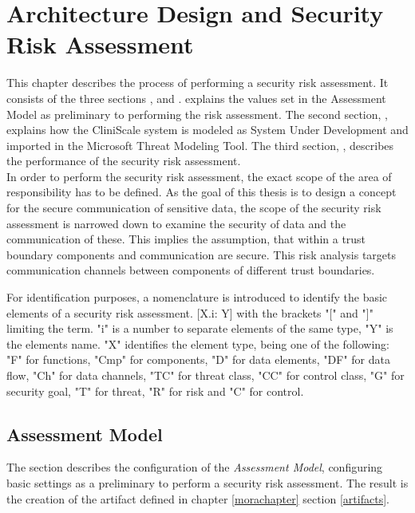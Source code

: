 \chapter{Architecture Design and Security Risk Assessment}
\label{designeval}
This chapter describes the process of performing a security risk assessment. It consists of the three sections \textit{}, \textit{} and \textit{}. \textit{} explains the values set in the Assessment Model as preliminary to performing the risk assessment. The second section, \textit{}, explains how the CliniScale system is modeled as System Under Development and imported in the Microsoft Threat Modeling Tool. The third section, \textit{}, describes the performance of the security risk assessment.\\
\newline
In order to perform the security risk assessment, the exact scope of the area of responsibility has to be defined. As the goal of this thesis is to design a concept for the secure communication of sensitive data, the scope of the security risk assessment is narrowed down to examine the security of data and the communication of these. This implies the assumption, that within a trust boundary components and communication are secure. This risk analysis targets communication channels between components of different trust boundaries.

For identification purposes, a nomenclature is introduced to identify the basic elements of a security risk assessment. [X.i: Y] with the brackets "[" and "]" limiting the term. "i" is a number to separate elements of the same type, "Y" is the elements name. "X" identifies the element type, being one of the following: "F" for functions, "Cmp" for components, "D" for data elements, "DF" for data flow, "Ch" for data channels, "TC" for threat class, "CC" for control class, "G" for security goal, "T" for threat, "R" for risk and "C" for control.


\section{Assessment Model}
\label{assessmentmodel}
The section describes the configuration of the \textit{Assessment Model}, configuring basic settings as a preliminary to perform a security risk assessment. The result is the creation of the artifact defined in chapter \ref{morachapter} section \ref{artifacts}.


